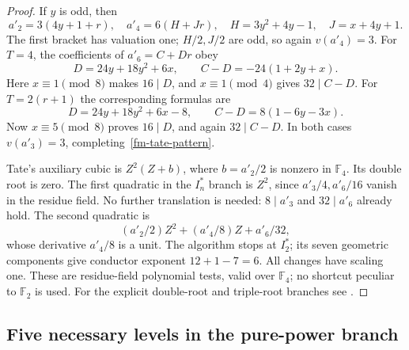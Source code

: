 \begin{proof}
If $y$ is odd, then
\[
 a'_2=3(4y+1+r),\quad a'_4=6(H+Jr),\quad
 H=3y^2+4y-1,\quad J=x+4y+1.
\]
The first bracket has valuation one; $H/2,J/2$ are odd, so again
$v(a'_4)=3$. For $T=4$, the coefficients of $a'_6=C+Dr$ obey
\[
 D=24y+18y^2+6x,\qquad C-D=-24(1+2y+x).
\]
Here $x\equiv1\pmod8$ makes $16\mid D$, and $x\equiv1\pmod4$ gives
$32\mid C-D$. For $T=2(r+1)$ the corresponding formulas are
\[
 D=24y+18y^2+6x-8,\qquad C-D=8(1-6y-3x).
\]
Now $x\equiv5\pmod8$ proves $16\mid D$, and again $32\mid C-D$.
In both cases $v(a'_3)=3$, completing~\eqref{fm-tate-pattern}.

Tate's auxiliary cubic is $Z^2(Z+b)$, where $b=a'_2/2$ is nonzero in
$\mathbb F_4$. Its double root is zero. The first quadratic in the
$I_n^*$ branch is $Z^2$, since $a'_3/4,a'_6/16$ vanish in the residue
field. No further translation is needed: $8\mid a'_3$ and $32\mid a'_6$
already hold. The second quadratic is
\[
 (a'_2/2)Z^2+(a'_4/8)Z+a'_6/32,
\]
whose derivative $a'_4/8$ is a unit. The algorithm stops at $I_2^*$;
its seven geometric components give conductor exponent $12+1-7=6$.
All changes have scaling one. These are residue-field polynomial tests,
valid over $\mathbb F_4$; no shortcut peculiar to $\mathbb F_2$ is used.
For the explicit double-root and triple-root branches see
\cite[Chapter~3, pp.~66--68]{Cremona1997Algorithms}.
\end{proof}

\subsection{Five necessary levels in the pure-power branch}


